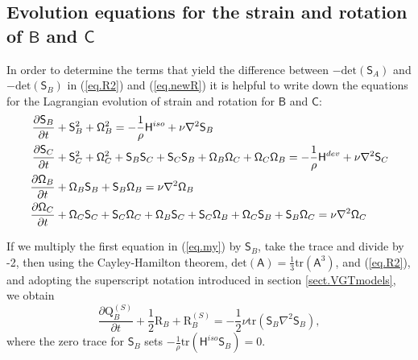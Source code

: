 \documentclass[preprint,amssymb,amsmath,aip,cha]{revtex4-1}
\begin{document}
\subsection{Evolution equations for the strain and rotation of $\mathsf{B}$ and $\mathsf{C}$}
In order to determine the terms that yield the difference between $-\mbox{det}(\mathsf{S}_{A})$ and $-\mbox{det}(\mathsf{S}_{B})$ in (\ref{eq.R2}) and (\ref{eq.newR}) it is helpful to write down the equations for the Lagrangian evolution of strain and rotation for $\mathsf{B}$ and $\mathsf{C}$:
\begin{align}
\notag
\frac{\partial \mathsf{S}_{B}}{\partial t} &+ \mathsf{S}_{B}^{2} + \mathsf{\Omega}_{B}^{2} = -\frac{1}{\rho} \mathsf{H}^{iso} + \nu \nabla^{2} \mathsf{S}_{B}  \\ 
\notag
\frac{\partial \mathsf{S}_{C}}{\partial t} &+ \mathsf{S}_{C}^{2} + \mathsf{\Omega}_{C}^{2}+\mathsf{S}_{B}\mathsf{S}_{C} + \mathsf{S}_{C}\mathsf{S}_{B} + \mathsf{\Omega}_{B}\mathsf{\Omega}_{C} + \mathsf{\Omega}_{C}\mathsf{\Omega}_{B} = -\frac{1}{\rho} \mathsf{H}^{dev} + \nu \nabla^{2} \mathsf{S}_{C} \\
\notag
\frac{\partial \mathsf{\Omega}_{B}}{\partial t} &+ \mathsf{\Omega}_{B}\mathsf{S}_{B} + \mathsf{S}_{B}\mathsf{\Omega}_{B} = \nu \nabla^{2} \mathsf{\Omega}_{B}\\ 
\frac{\partial \mathsf{\Omega}_{C}}{\partial t} &+ \mathsf{\Omega}_{C}\mathsf{S}_{C} + \mathsf{S}_{C}\mathsf{\Omega}_{C} + \mathsf{\Omega}_{B}\mathsf{S}_{C} + \mathsf{S}_{C}\mathsf{\Omega}_{B} + \mathsf{\Omega}_{C}\mathsf{S}_{B} + \mathsf{S}_{B}\mathsf{\Omega}_{C} = \nu \nabla^{2} \mathsf{\Omega}_{C}
\label{eq.my}
\end{align}

If we multiply the first equation in (\ref{eq.my}) by $\mathsf{S}_{B}$, take the trace and divide by -2, then using the Cayley-Hamilton theorem, $\mbox{det}(\mathsf{A}) = \frac{1}{3}\mbox{tr}(\mathsf{A}^{3})$, and (\ref{eq.R2}), and adopting the superscript notation introduced in section \ref{sect.VGTmodels}, we obtain 
\begin{equation}
\frac{\partial \mbox{Q}^{(S)}_{B}}{\partial t} +\frac{1}{2}\mbox{R}_{B} + \mbox{R}^{(S)}_{B} =  -\frac{1}{2}\nu\mbox{tr}(\mathsf{S}_{B} \nabla^{2} \mathsf{S}_{B}),
\label{eq.mySB}
\end{equation} 
where the zero trace for $\mathsf{S}_{B}$ sets $-\frac{1}{\rho} \mbox{tr}(\mathsf{H}^{iso}\mathsf{S}_{B}) = 0$. 
\end{document}
